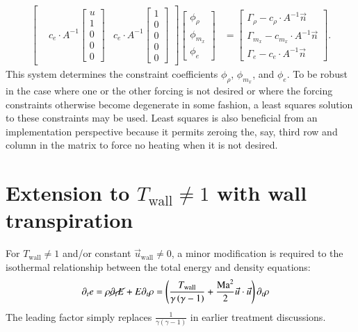 \documentclass[letterpaper,11pt,nointlimits,reqno]{amsart}
\begin{document}
\begin{align}
\begin{bmatrix}
    &
    c_{e} \cdot A^{-1} \begin{bmatrix} u \\ 1 \\ 0 \\ 0 \\ 0 \end{bmatrix}
    &
    c_{e} \cdot A^{-1} \begin{bmatrix} 1 \\ 0 \\ 0 \\ 0 \\ 0 \end{bmatrix}
  \end{bmatrix}
  \begin{bmatrix}
    \phi_\rho
    \\
    \phi_{m_x}
    \\
    \phi_{e}
  \end{bmatrix}
&=
  \begin{bmatrix}
    \Gamma_\rho - c_\rho \cdot{} A^{-1} \vec{n}
    \\
    \Gamma_{m_x} - c_{m_x} \cdot{} A^{-1} \vec{n}
    \\
    \Gamma_{e} - c_{e} \cdot{} A^{-1} \vec{n}
  \end{bmatrix}
.
\end{align}
This system determines the constraint coefficients $\phi_\rho$, $\phi_{m_x}$,
and $\phi_{e}$.  To be robust in the case where one or the other forcing is not
desired or where the forcing constraints otherwise become degenerate in some
fashion, a least squares solution to these constraints may be used.  Least
squares is also beneficial from an implementation perspective because it
permits zeroing the, say, third row and column in the matrix to force no
heating when it is not desired.


\section{Extension to $T_\mathrm{wall}\neq{}1$ with wall transpiration}

For $T_\mathrm{wall}\neq{}1$ and/or constant $\vec{u}_\mathrm{wall}\neq{}0$, a
minor modification is required to the isothermal relationship between the total
energy and density equations:
\begin{align}
  \partial_{t} e
  &=  \rho \cancel{\partial_{t} {E}}
    + {E} \partial_{t} \rho
  = \left(
      \frac{T_\mathrm{wall}}{\gamma\left(\gamma-1\right)}
    + \frac{\mbox{Ma}^2}{2}\vec{u}\cdot\vec{u}
    \right) \partial_{t} \rho
\end{align}
The leading factor simply replaces $\frac{1}{\gamma\left(\gamma-1\right)}$ in
earlier treatment discussions.

\newcommand*{\doi}[1]{\href{http://dx.doi.org/\detokenize{#1}}{doi: #1}}


\end{document}
